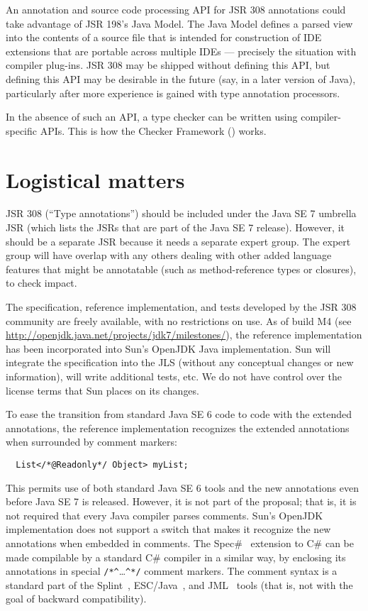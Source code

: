 \documentclass[10pt]{article}
\begin{document}
An annotation and source code processing API for JSR 308 annotations could
take advantage of JSR 198's Java Model.  The Java Model defines a parsed
view into the contents of a source file that is intended for construction
of IDE extensions that are portable across multiple IDEs --- precisely the
situation with compiler plug-ins.  JSR 308 may be shipped without defining
this API, but defining this API may be desirable in the future (say, in a
later version of Java), particularly after more experience is gained with
type annotation processors.

In the absence of such an API, a type checker can be written using
compiler-specific APIs.  This is how the Checker Framework
() works.


\section{Logistical matters\label{logistics}}

JSR 308 (``Type annotations'') should be included under the Java SE 7
umbrella JSR (which lists the JSRs that are part of the Java SE 7 release).
However, it should be a separate JSR because it needs a separate expert group.
The expert group will have overlap with any others dealing with other
added language features that might be annotatable (such as method-reference
types or closures), to check impact.

The specification, reference implementation, and tests developed by the
JSR 308 community are freely available, with no restrictions on use.  As of
build M4 (see \url{http://openjdk.java.net/projects/jdk7/milestones/}), the
reference implementation has been incorporated into Sun's OpenJDK Java
implementation.  Sun will integrate the specification into the JLS (without
any conceptual changes or new information), will write additional tests,
etc.  We do not have control over the license terms that Sun places on its
changes.

To ease the transition from standard Java SE 6 code to code with the extended
annotations, the reference implementation recognizes the extended
annotations when surrounded by comment markers:
\begin{Verbatim}
  List</*@Readonly*/ Object> myList;
\end{Verbatim}
This permits use of both standard Java SE 6 tools and the new annotations even
before Java SE 7 is released.  However, it is not part of the proposal;
that is, it is not required that every Java compiler parses comments.
Sun's OpenJDK implementation does not support a switch that
makes it recognize the new annotations when embedded in comments.
The Spec\#~\cite{BarnettLS2004} extension to C\# can be made compilable by
a standard C\# compiler in a similar way, by enclosing its annotations in
special \verb|/*^|\ldots\verb|^*/| comment markers.
The  comment syntax is a standard part of the
Splint~\cite{Evans96}, ESC/Java~\cite{FlanaganLLNSS02}, and
JML~\cite{LeavensBR2006:JML} tools (that is, not
with the goal of backward compatibility).
\end{document}
